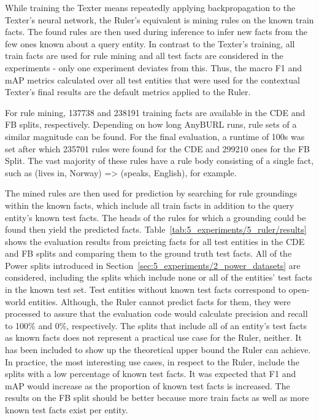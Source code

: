 While training the Texter means repeatedly applying backpropagation to the Texter's neural network, the Ruler's equivalent is mining rules on the known train facts. The found rules are then used during inference to infer new facts from the few ones known about a query entity. In contrast to the Texter's training, all train facts are used for rule mining and all test facts are considered in the experiments - only one experiment deviates from this. Thus, the macro F1 and mAP metrics calculated over all test entities that were used for the contextual Texter's final results are the default metrics applied to the Ruler.

For rule mining, \num{137738} and \num{238191} training facts are available in the CDE and FB splits, respectively. Depending on how long AnyBURL runs, rule sets of a similar magnitude can be found. For the final evaluation, a runtime of 100s was set after which \num{235701} rules were found for the CDE and \num{299210} ones for the FB Split. The vast majority of these rules have a rule body consisting of a single fact, such as (lives in, Norway) => (speaks, English), for example.

The mined rules are then used for prediction by searching for rule groundings within the known facts, which include all train facts in addition to the query entity's known test facts. The heads of the rules for which a grounding could be found then yield the predicted facts. Table~\ref{tab:5_experiments/5_ruler/results} shows the evaluation results from preicting facts for all test entities in the CDE and FB splits and comparing them to the ground truth test facts. All of the Power splits introduced in Section~\ref{sec:5_experiments/2_power_datasets} are considered, including the splits which include none or all of the entities' test facts in the known test set. Test entities without known test facts correspond to open-world entities. Although, the Ruler cannot predict facts for them, they were processed to assure that the evaluation code would calculate precision and recall to 100\% and 0\%, respectively. The splits that include all of an entity's test facts as known facts does not represent a practical use case for the Ruler, neither. It has been included to show up the theoretical upper bound the Ruler can achieve. In practice, the most interesting use cases, in respect to the Ruler, include the splits with a low percentage of known test facts. It was expected that F1 and mAP would increase as the proportion of known test facts is increased. The results on the FB split should be better because  more train facts as well as more known test facts exist per entity.

